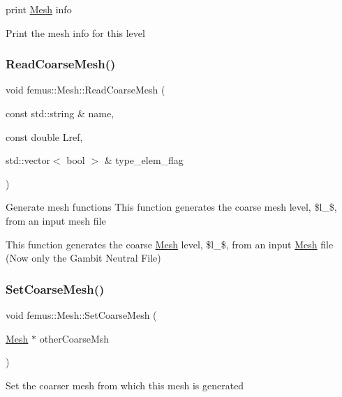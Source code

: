 print \mbox{\hyperlink{classfemus_1_1_mesh}{Mesh}} info 

Print the mesh info for this level \mbox{\label{classfemus_1_1_mesh_adefc4c81e228e9d3267583c33da32b01}} 
\subsubsection{\texorpdfstring{Read\+Coarse\+Mesh()}{ReadCoarseMesh()}}
{\footnotesize\ttfamily void femus\+::\+Mesh\+::\+Read\+Coarse\+Mesh (\begin{DoxyParamCaption}\item[{const std\+::string \&}]{name,  }\item[{const double}]{Lref,  }\item[{std\+::vector$<$ bool $>$ \&}]{type\+\_\+elem\+\_\+flag }\end{DoxyParamCaption})}

Generate mesh functions This function generates the coarse mesh level, \$l\+\_\$, from an input mesh file

This function generates the coarse \mbox{\hyperlink{classfemus_1_1_mesh}{Mesh}} level, \$l\+\_\$, from an input \mbox{\hyperlink{classfemus_1_1_mesh}{Mesh}} file (Now only the Gambit Neutral File) \mbox{\label{classfemus_1_1_mesh_a2a8172f3b7dff055b8a18fd093da3b74}} 
\subsubsection{\texorpdfstring{Set\+Coarse\+Mesh()}{SetCoarseMesh()}}
{\footnotesize\ttfamily void femus\+::\+Mesh\+::\+Set\+Coarse\+Mesh (\begin{DoxyParamCaption}\item[{\mbox{\hyperlink{classfemus_1_1_mesh}{Mesh}} $\ast$}]{other\+Coarse\+Msh }\end{DoxyParamCaption})\hspace{0.3cm}{\ttfamily [inline]}}

Set the coarser mesh from which this mesh is generated \mbox{\label{classfemus_1_1_mesh_a161539f93964fec14700ae553088a654}} 
